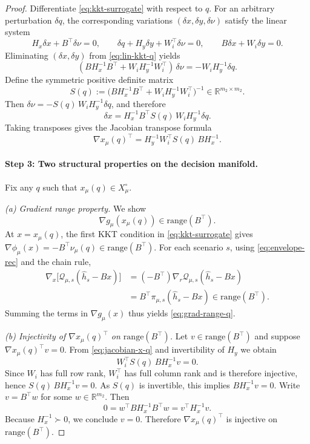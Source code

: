 \documentclass[11pt]{article}
\theoremstyle{plain}
\theoremstyle{definition}
\begin{document}
\begin{proof}
Differentiate \eqref{eq:kkt-surrogate} with respect to $q$. For an arbitrary perturbation $\delta q$, the
corresponding variations $(\delta x,\delta y,\delta\nu)$ satisfy the linear system
\begin{equation}
\label{eq:lin-kkt-q}
H_x\delta x+B^\top\delta\nu=0,\qquad
\delta q+H_y\delta y+W_i^\top\delta\nu=0,\qquad
B\delta x+W_i\delta y=0.
\end{equation}
Eliminating $(\delta x,\delta y)$ from \eqref{eq:lin-kkt-q} yields
\[
(B H_x^{-1}B^\top+W_i H_y^{-1}W_i^\top)\,\delta\nu=-W_i H_y^{-1}\delta q.
\]
Define the symmetric positive definite matrix
\[
S(q):=\bigl(B H_x^{-1}B^\top+W_i H_y^{-1}W_i^\top\bigr)^{-1}\in\mathbb{R}^{m_2\times m_2}.
\]
Then $\delta\nu=-S(q)\,W_iH_y^{-1}\delta q$, and therefore
\[
\delta x
=H_x^{-1}B^\top S(q)\,W_iH_y^{-1}\delta q.
\]
Taking transposes gives the Jacobian transpose formula
\begin{equation}
\label{eq:jacobian-x-q}
\nabla x_\mu(q)^\top
=
H_y^{-1}W_i^\top S(q)\,B H_x^{-1}.
\end{equation}

\paragraph{Step 3: Two structural properties on the decision manifold.}
Fix any $q$ such that $x_\mu(q)\in X_\mu^\circ$.

\smallskip
\noindent\emph{(a) Gradient range property.}
We show
\begin{equation}
\label{eq:grad-range-q}
\nabla g_\mu(x_\mu(q))\in\mathrm{range}(B^\top).
\end{equation}
At $x=x_\mu(q)$, the first KKT condition in \eqref{eq:kkt-surrogate} gives
$\nabla\phi_\mu(x)=-B^\top\nu_\mu(q)\in\mathrm{range}(B^\top)$.
For each scenario $s$, using \eqref{eq:envelope-rec} and the chain rule,
\[
\begin{aligned}
\nabla_x\bigl[\mathcal{Q}_{\mu,s}(\hat h_s-Bx)\bigr]
&=(-B^\top)\nabla_r\mathcal{Q}_{\mu,s}(\hat h_s-Bx)\\
&=B^\top\pi_{\mu,s}(\hat h_s-Bx)\in\mathrm{range}(B^\top).
\end{aligned}
\]
Summing the terms in $\nabla g_\mu(x)$ thus yields \eqref{eq:grad-range-q}.

\smallskip
\noindent\emph{(b) Injectivity of $\nabla x_\mu(q)^\top$ on $\mathrm{range}(B^\top)$.}
Let $v\in\mathrm{range}(B^\top)$ and suppose $\nabla x_\mu(q)^\top v=0$.
From \eqref{eq:jacobian-x-q} and invertibility of $H_y$ we obtain
\[
W_i^\top S(q)\,B H_x^{-1}v=0.
\]
Since $W_i$ has full row rank, $W_i^\top$ has full column rank and is therefore injective, hence
$S(q)\,B H_x^{-1}v=0$. As $S(q)$ is invertible, this implies $B H_x^{-1}v=0$.
Write $v=B^\top w$ for some $w\in\mathbb{R}^{m_2}$. Then
\[
0=w^\top B H_x^{-1}B^\top w=v^\top H_x^{-1}v.
\]
Because $H_x^{-1}\succ0$, we conclude $v=0$. Therefore $\nabla x_\mu(q)^\top$ is injective on
$\mathrm{range}(B^\top)$.


\end{proof}
\end{document}
